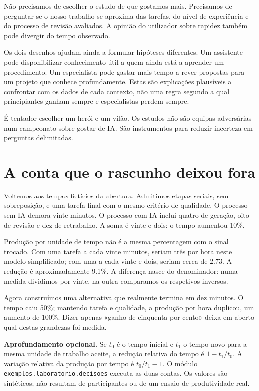 Não precisamos de escolher o estudo de que gostamos mais. Precisamos de perguntar se o nosso trabalho se aproxima das tarefas, do nível de experiência e do processo de revisão avaliados. A opinião do utilizador sobre rapidez também pode divergir do tempo observado.

Os dois desenhos ajudam ainda a formular hipóteses diferentes. Um assistente pode disponibilizar conhecimento útil a quem ainda está a aprender um procedimento. Um especialista pode gastar mais tempo a rever propostas para um projeto que conhece profundamente. Estas são explicações plausíveis a confrontar com os dados de cada contexto, não uma regra segundo a qual principiantes ganham sempre e especialistas perdem sempre.

É tentador escolher um herói e um vilão. Os estudos não são equipas adversárias num campeonato sobre gostar de IA. São instrumentos para reduzir incerteza em perguntas delimitadas.

\section{A conta que o rascunho deixou fora}
Voltemos aos tempos fictícios da abertura. Admitimos etapas seriais, sem sobreposição, e uma tarefa final com o mesmo critério de qualidade. O processo sem IA demora vinte minutos. O processo com IA inclui quatro de geração, oito de revisão e dez de retrabalho. A soma é vinte e dois: o tempo aumentou 10\%.

Produção por unidade de tempo não é a mesma percentagem com o sinal trocado. Com uma tarefa a cada vinte minutos, seriam três por hora neste modelo simplificado; com uma a cada vinte e dois, seriam cerca de $2.73$. A redução é aproximadamente 9.1\%. A diferença nasce do denominador: numa medida dividimos por vinte, na outra comparamos os respetivos inversos.

Agora construímos uma alternativa que realmente termina em dez minutos. O tempo caiu 50\%; mantendo tarefa e qualidade, a produção por hora duplicou, um aumento de 100\%. Dizer apenas «ganho de cinquenta por cento» deixa em aberto qual destas grandezas foi medida.

\textbf{Aprofundamento opcional.} Se $t_0$ é o tempo inicial e $t_1$ o tempo novo para a mesma unidade de trabalho aceite, a redução relativa do tempo é $1-t_1/t_0$. A variação relativa da produção por tempo é $t_0/t_1-1$. O módulo \texttt{exemplos.laboratorio.decisoes} executa as duas contas. Os valores são sintéticos; não resultam de participantes ou de um ensaio de produtividade real.

